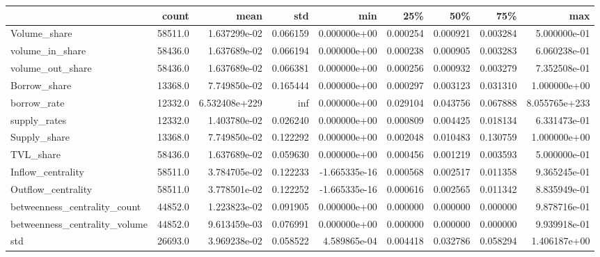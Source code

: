 \begin{tabular}{lrrrrrrrr}
\toprule
{} &    count &           mean &       std &           min &       25\% &       50\% &       75\% &            max \\
\midrule
Volume\_share                  &  58511.0 &   1.637299e-02 &  0.066159 &  0.000000e+00 &  0.000254 &  0.000921 &  0.003284 &   5.000000e-01 \\
volume\_in\_share               &  58436.0 &   1.637689e-02 &  0.066194 &  0.000000e+00 &  0.000238 &  0.000905 &  0.003283 &   6.060238e-01 \\
volume\_out\_share              &  58436.0 &   1.637689e-02 &  0.066381 &  0.000000e+00 &  0.000256 &  0.000932 &  0.003279 &   7.352508e-01 \\
Borrow\_share                  &  13368.0 &   7.749850e-02 &  0.165444 &  0.000000e+00 &  0.000297 &  0.003123 &  0.031310 &   1.000000e+00 \\
borrow\_rate                   &  12332.0 &  6.532408e+229 &       inf &  0.000000e+00 &  0.029104 &  0.043756 &  0.067888 &  8.055765e+233 \\
supply\_rates                  &  12332.0 &   1.403780e-02 &  0.026240 &  0.000000e+00 &  0.000809 &  0.004425 &  0.018134 &   6.331473e-01 \\
Supply\_share                  &  13368.0 &   7.749850e-02 &  0.122292 &  0.000000e+00 &  0.002048 &  0.010483 &  0.130759 &   1.000000e+00 \\
TVL\_share                     &  58436.0 &   1.637689e-02 &  0.059630 &  0.000000e+00 &  0.000456 &  0.001219 &  0.003593 &   5.000000e-01 \\
Inflow\_centrality             &  58511.0 &   3.784705e-02 &  0.122233 & -1.665335e-16 &  0.000568 &  0.002517 &  0.011358 &   9.365245e-01 \\
Outflow\_centrality            &  58511.0 &   3.778501e-02 &  0.122252 & -1.665335e-16 &  0.000616 &  0.002565 &  0.011342 &   8.835949e-01 \\
betweenness\_centrality\_count  &  44852.0 &   1.223823e-02 &  0.091905 &  0.000000e+00 &  0.000000 &  0.000000 &  0.000000 &   9.878716e-01 \\
betweenness\_centrality\_volume &  44852.0 &   9.613459e-03 &  0.076991 &  0.000000e+00 &  0.000000 &  0.000000 &  0.000000 &   9.939918e-01 \\
std                           &  26693.0 &   3.969238e-02 &  0.058522 &  4.589865e-04 &  0.004418 &  0.032786 &  0.058294 &   1.406187e+00 \\
\bottomrule
\end{tabular}
